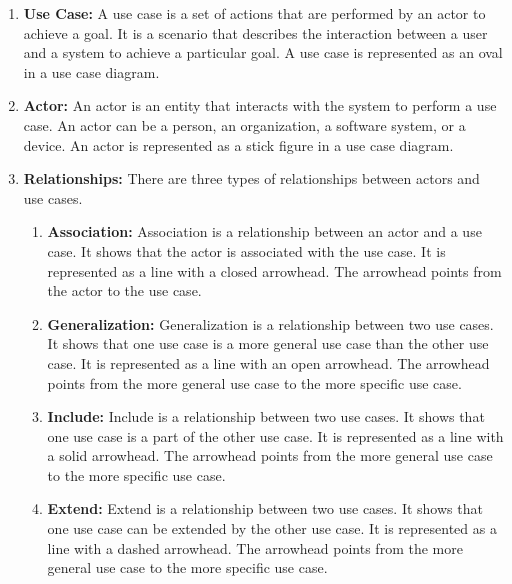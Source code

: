 \documentclass[11pt]{article}
\begin{document}
\begin{enumerate}
	\item \textbf{Use Case:} A use case is a set of actions that are performed by an actor to achieve a goal. It is a scenario that describes the interaction between a user and a system to achieve a particular goal. A use case is represented as an oval in a use case diagram.
	\item \textbf{Actor:} An actor is an entity that interacts with the system to perform a use case. An actor can be a person, an organization, a software system, or a device. An actor is represented as a stick figure in a use case diagram.
	\item \textbf{Relationships:} There are three types of relationships between actors and use cases.
	      \begin{enumerate}
		      \item \textbf{Association:} Association is a relationship between an actor and a use case. It shows that the actor is associated with the use case. It is represented as a line with a closed arrowhead. The arrowhead points from the actor to the use case.
		      \item \textbf{Generalization:} Generalization is a relationship between two use cases. It shows that one use case is a more general use case than the other use case. It is represented as a line with an open arrowhead. The arrowhead points from the more general use case to the more specific use case.
		      \item \textbf{Include:} Include is a relationship between two use cases. It shows that one use case is a part of the other use case. It is represented as a line with a solid arrowhead. The arrowhead points from the more general use case to the more specific use case.
		      \item \textbf{Extend:} Extend is a relationship between two use cases. It shows that one use case can be extended by the other use case. It is represented as a line with a dashed arrowhead. The arrowhead points from the more general use case to the more specific use case.
	      \end{enumerate}
\end{enumerate}
\end{document}
